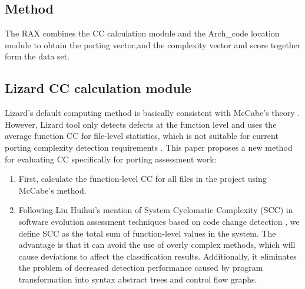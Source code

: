 \documentclass[sigconf,screen,review]{acmart}
\begin{document}
\subsection{Method}
The RAX combines the CC calculation module and the Arch\_code location module to obtain the porting vector,and the complexity vector and score together form the data set.

\subsection{Lizard CC calculation module}
Lizard's default computing method is basically consistent with McCabe's theory \cite{1702388}.
However, Lizard tool only detects defects at the function level and uses the average function CC for file-level statistics, which is not suitable for current porting complexity detection requirements \cite{9402593}.
This paper proposes a new method for evaluating CC specifically for porting assessment work:
\begin{enumerate}
  \item First, calculate the function-level CC for all files in the project using McCabe's method.
  \item Following Liu Huihui's mention of System Cyclomatic Complexity (SCC) in software evolution assessment techniques based on code change detection \cite{liuhuihui00}, we define SCC as the total sum of function-level values in the system.
  The advantage is that it can avoid the use of overly complex methods, which will cause deviations to affect the classification results.
  Additionally, it eliminates the problem of decreased detection performance caused by program transformation into syntax abstract trees and control flow graphs.
\end{enumerate}
\end{document}
